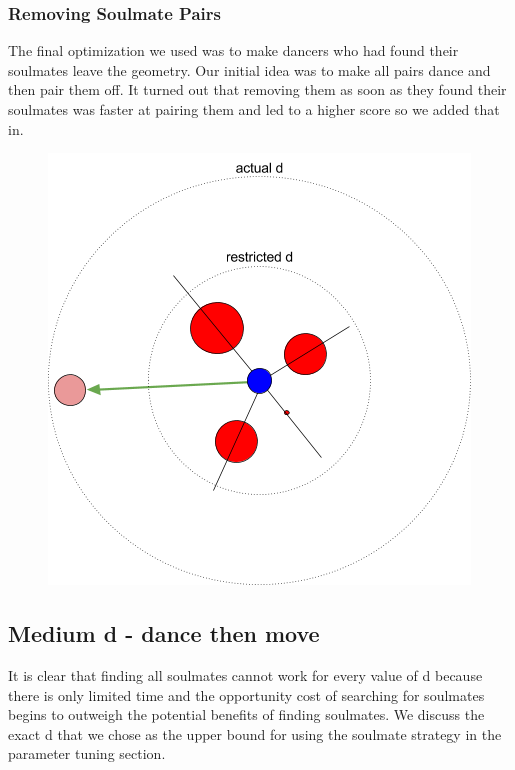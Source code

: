 \subsubsection{Removing Soulmate Pairs}
The final optimization we used was to make dancers who had found their soulmates leave the geometry. Our initial idea was to make all pairs dance and then pair them off. It turned out that removing them as soon as they found their soulmates was faster at pairing them and led to a higher score so we added that in.\\


\begin{figure}[h]
\center
\includegraphics[scale=1]{angle2.png}
\caption{}
\label{fig:angle2}
\end{figure}

\subsection{Medium d - dance then move}
It is clear that finding all soulmates cannot work for every value of d because there is only limited time and the opportunity cost of searching for soulmates begins to outweigh the potential benefits of finding soulmates. We discuss the exact d that we chose as the upper bound for using the soulmate strategy in the parameter tuning section.\\
